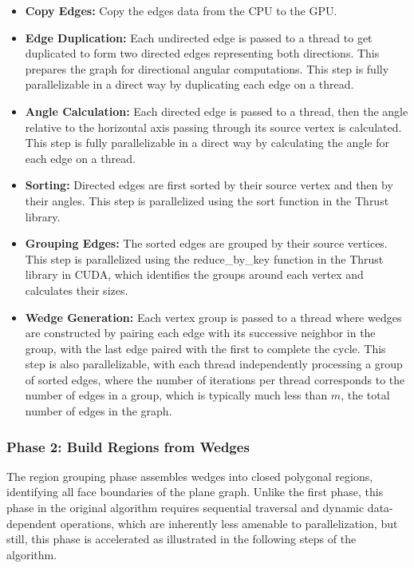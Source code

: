 \begin{itemize}
    \item \textbf{Copy Edges:} Copy the edges data from the CPU to the GPU.
    \item \textbf{Edge Duplication:} Each undirected edge is passed to a thread to get duplicated to form two directed edges representing both directions. This prepares the graph for directional angular computations. This step is fully parallelizable in a direct way by duplicating each edge on a thread.
    \item \textbf{Angle Calculation:} Each directed edge is passed to a thread, then the angle relative to the horizontal axis passing through its source vertex is calculated.  This step is fully parallelizable in a direct way by calculating the angle for each edge on a thread.
    \item \textbf{Sorting:} Directed edges are first sorted by their source vertex and then by their angles. This step is parallelized using the sort function in the Thrust library.
    \item \textbf{Grouping Edges:} The sorted edges are grouped by their source vertices. This step is parallelized using the reduce\_by\_key function in the Thrust library in CUDA, which identifies the groups around each vertex and calculates their sizes.
    \item \textbf{Wedge Generation:} Each vertex group is passed to a thread where wedges are constructed by pairing each edge with its successive neighbor in the group, with the last edge paired with the first to complete the cycle. This step is also parallelizable, with each thread independently processing a group of sorted edges, where the number of iterations per thread corresponds to the number of edges in a group, which is typically much less than \(m\), the total number of edges in the graph.
\end{itemize}

\subsubsection{Phase 2: Build Regions from Wedges}
The region grouping phase assembles wedges into closed polygonal regions, identifying all face boundaries of the plane graph. Unlike the first phase, this phase in the original algorithm requires sequential traversal and dynamic data-dependent operations, which are inherently less amenable to parallelization, but still, this phase is accelerated as illustrated in the following steps of the algorithm.

